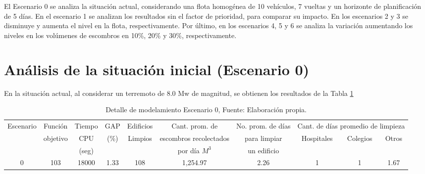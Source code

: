 \documentclass[12pt,a4paper]{article}
\begin{document}
El Escenario 0 se analiza la situación actual, considerando una flota homogénea de 10 vehículos, 7 vueltas y un horizonte de planificación de 5 días. En el escenario 1 se analizan los resultados sin el factor de prioridad, para comparar su impacto. En los escenarios 2 y 3 se disminuye y aumenta el nivel en la flota, respectivamente. Por último, en los escenarios 4, 5 y 6 se analiza la variación aumentando los niveles en los volúmenes de escombros en 10\%, 20\% y 30\%, respectivamente.

\section{Análisis de la situación inicial (Escenario 0)}

En la situación actual, al considerar un terremoto de 8.0 Mw de magnitud, se obtienen los resultados de la Tabla \ref{tab:tab2}

\begin{table}[h!]
\resizebox{15cm}{!} {
\begin{tabular}{c|c|c|c|c|c|c|c|c|c}
\hline
\multirow{3}{*}{Escenario} & Función                   & Tiempo & GAP                   & Edificios                & Cant. prom. de                 & No. prom. de días & \multicolumn{3}{c|}{Cant. de días promedio de limpieza}                          \\ \cline{8-10} 
                           & \multirow{2}{*}{objetivo} & CPU    & \multirow{2}{*}{(\%)} & \multirow{2}{*}{Limpios} & escombros recolectados         & para limpiar      & \multirow{2}{*}{Hospitales} & \multirow{2}{*}{Colegios} & \multirow{2}{*}{Otros} \\
                           &                           & (seg)  &                       &                          & por día $M^{3}$ & un edificio       &                             &                           &                        \\ \hline
0                          & 103                       & 18000  & 1.33                  & 108                      & 1,254.97                         & 2.26              & 1                           & 1                         & 1.67                   \\ \hline
\end{tabular}
}
\caption{Detalle de modelamiento Escenario 0, Fuente: Elaboración propia.}
\label{tab:tab2}
\end{table}

\end{document}
